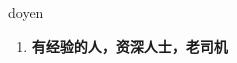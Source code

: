 
\begin{frame}
{\huge doyen}
\begin{center}
\begin{enumerate}\Large
  \item \textbf{有经验的人，资深人士，老司机}
\end{enumerate}
\end{center}
\end{frame}
